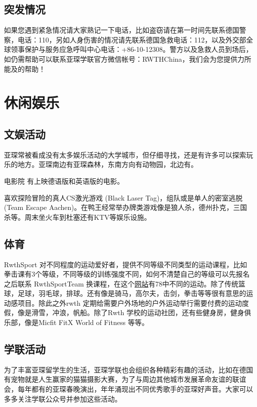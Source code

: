   \subsection{突发情况}\label{subsec:突发情况}

    如果您遇到紧急情况请大家熟记一下电话，比如盗窃请在第一时间先联系德国警察，电话：110，另如人身伤害的情况请先联系德国急救电话：112，以及外交部全球领事保护与服务应急呼叫中心电话：+86-10-12308。警方以及急救人员到场后，如仍需帮助可以联系亚琛学联官方微信帐号：RWTHChina，我们会为您提供力所能及的帮助！

\section{休闲娱乐}\label{sec:休闲娱乐}

  \subsection{文娱活动}\label{subsec:文娱活动}

    亚琛常被看成没有太多娱乐活动的大学城市，但仔细寻找，还是有许多可以探索玩乐的地方。亚琛南边有亚琛森林，东南方向有动物园，北边有。

    电影院  有上映德语版和英语版的电影。

    喜欢探险冒险的真人CS激光游戏 (Black Laser Tag)，组队或是单人的密室逃脱 (Team Escape Aachen)。在鸭王经常举办牌类游戏像是狼人杀，德州扑克，三国杀等。周末坐火车到杜塞还有KTV等娱乐设施。

  \subsection{体育}\label{subsec:体育}

    RwthSport 对不同程度的运动爱好者，提供不同等级不同类型的运动课程，比如拳击课有3个等级，不同等级的训练强度不同，如何不清楚自己的等级可以先报名之后联系 RwthSportTeam 换课程，在这个\href{https://hochschulsport.rwth-aachen.de/cms/HSZ/Sport/Erweitertes-Uebergangsprogramm/~hpoua/Sportartensuche/}{网站}有78中不同的运动。除了传统篮球，足球，羽毛球，排球。还有像是骑马，高尔夫，击剑，拳击等等很有意思的运动感项目。除此之外rwth 定期给需要户外场地的户外运动举行需要付费的运动度假，像是滑雪，冲浪，帆船。除了Rwth 学校的运动社团，还有些健身房，健身俱乐部，像是Micfit FitX World of Fitness 等等。

  \subsection{学联活动}\label{subsec:学联活动}

    为了丰富亚琛留学生的生活，亚琛学联也会组织各种精彩有趣的活动，比如在德国有宠物就是人生赢家的猫猫摄影大赛，为了与周边其他城市发展革命友谊的联谊会，每年都有的亚琛春晚演出，年年涌现出不同优秀歌手的亚琛好声音。大家可以多多关注学联公众号并参加这些活动。

